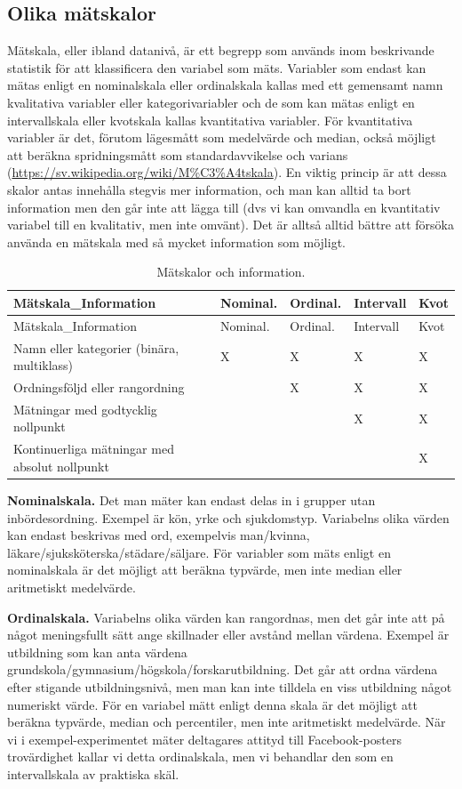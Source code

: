 \documentclass[
]{book}
\begin{document}
\hypertarget{sub07.3.1}{%
\subsection{Olika mätskalor}\label{sub07.3.1}}

Mätskala, eller ibland datanivå, är ett begrepp som används inom beskrivande statistik för att klassificera den variabel som mäts. Variabler som endast kan mätas enligt en nominalskala eller ordinalskala kallas med ett gemensamt namn kvalitativa variabler eller kategorivariabler och de som kan mätas enligt en intervallskala eller kvotskala kallas kvantitativa variabler. För kvantitativa variabler är det, förutom lägesmått som medelvärde och median, också möjligt att beräkna spridningsmått som standardavvikelse och varians (\url{https://sv.wikipedia.org/wiki/M\%C3\%A4tskala}). En viktig princip är att dessa skalor antas innehålla stegvis mer information, och man kan alltid ta bort information men den går inte att lägga till (dvs vi kan omvandla en kvantitativ variabel till en kvalitativ, men inte omvänt). Det är alltså alltid bättre att försöka använda en mätskala med så mycket information som möjligt.

\begin{longtable}[]{@{}lllll@{}}
\caption{\label{tab:tab-02-07-3-1-01}Mätskalor och information.}\tabularnewline
\toprule
Mätskala\_Information & Nominal. & Ordinal. & Intervall & Kvot\tabularnewline
\midrule
\endfirsthead
\toprule
Mätskala\_Information & Nominal. & Ordinal. & Intervall & Kvot\tabularnewline
\midrule
\endhead
Namn eller kategorier (binära, multiklass) & X & X & X & X\tabularnewline
Ordningsföljd eller rangordning & & X & X & X\tabularnewline
Mätningar med godtycklig nollpunkt & & & X & X\tabularnewline
Kontinuerliga mätningar med absolut nollpunkt & & & & X\tabularnewline
\bottomrule
\end{longtable}

\textbf{Nominalskala.} Det man mäter kan endast delas in i grupper utan inbördesordning. Exempel är kön, yrke och sjukdomstyp. Variabelns olika värden kan endast beskrivas med ord, exempelvis man/kvinna, läkare/sjuksköterska/städare/säljare. För variabler som mäts enligt en nominalskala är det möjligt att beräkna typvärde, men inte median eller aritmetiskt medelvärde.

\textbf{Ordinalskala.} Variabelns olika värden kan rangordnas, men det går inte att på något meningsfullt sätt ange skillnader eller avstånd mellan värdena. Exempel är utbildning som kan anta värdena grundskola/gymnasium/högskola/forskarutbildning. Det går att ordna värdena efter stigande utbildningsnivå, men man kan inte tilldela en viss utbildning något numeriskt värde. För en variabel mätt enligt denna skala är det möjligt att beräkna typvärde, median och percentiler, men inte aritmetiskt medelvärde. När vi i exempel-experimentet mäter deltagares attityd till Facebook-posters trovärdighet kallar vi detta ordinalskala, men vi behandlar den som en intervallskala av praktiska skäl.
\end{document}
